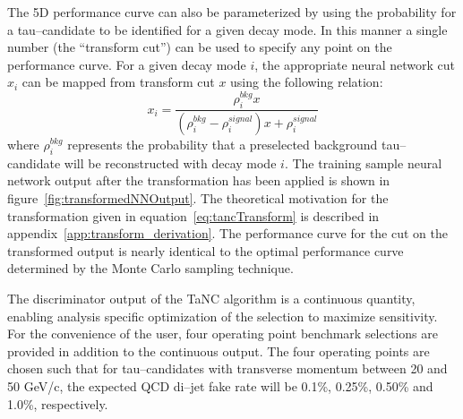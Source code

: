 The 5D performance curve can also be parameterized by using the probability for
a tau--candidate to be identified for a given decay mode.  In this manner a
single number (the ``transform cut'') can be used to specify any point on the
performance curve.  For a given decay mode $i$, the appropriate neural network cut $x_i$
can be mapped from transform cut $x$ using the following relation:
\begin{equation}
   x_i = \frac{\rho^{bkg}_i x} {(\rho^{bkg}_i - \rho^{signal}_i)x + \rho^{signal}_i}
   \label{eq:tancTransform}
\end{equation}
where $\rho^{bkg}_i$ represents the probability that a preselected background
tau--candidate will be reconstructed with decay mode $i$.  The training sample
neural network output after the transformation has been applied is shown in
figure~\ref{fig:transformedNNOutput}.  The theoretical motivation for the
transformation given in equation~\ref{eq:tancTransform} is described in
appendix~\ref{app:transform_derivation}.  The performance curve for the cut on
the transformed output is nearly identical to the optimal performance curve
determined by the Monte Carlo sampling technique. 

The discriminator output of the TaNC algorithm is a continuous quantity,
enabling analysis specific optimization of the selection to maximize
sensitivity.  For the convenience of the user, four operating point benchmark
selections are provided in addition to the continuous output. The four operating
points are chosen such that for tau--candidates with transverse momentum between
20 and 50 GeV/c, the expected QCD di--jet fake rate will be 0.1\%, 0.25\%,
0.50\% and 1.0\%, respectively.  

